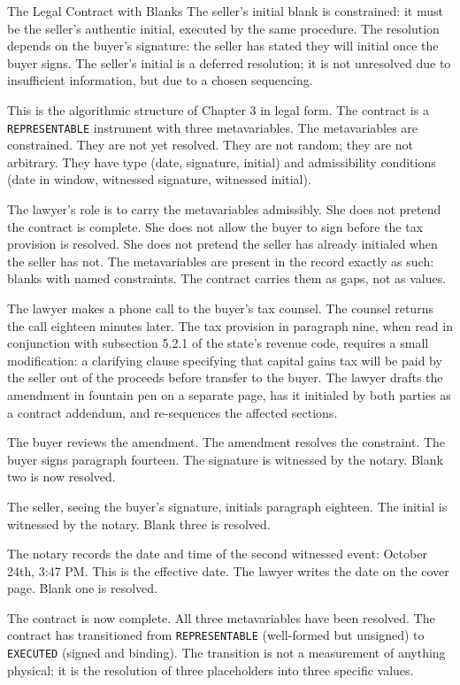 \begin{coda}{The Legal Contract with Blanks}
The seller's initial blank is constrained: it must be the seller's
authentic initial, executed by the same procedure. The resolution
depends on the buyer's signature: the seller has stated they will
initial once the buyer signs. The seller's initial is a deferred
resolution; it is not unresolved due to insufficient information, but
due to a chosen sequencing.

This is the algorithmic structure of Chapter 3 in legal form. The
contract is a \texttt{REPRESENTABLE} instrument with three
metavariables. The metavariables are constrained. They are not yet
resolved. They are not random; they are not arbitrary. They have type
(date, signature, initial) and admissibility conditions (date in
window, witnessed signature, witnessed initial).

The lawyer's role is to carry the metavariables admissibly. She does
not pretend the contract is complete. She does not allow the buyer to
sign before the tax provision is resolved. She does not pretend the
seller has already initialed when the seller has not. The metavariables
are present in the record exactly as such: blanks with named
constraints. The contract carries them as gaps, not as values.

The lawyer makes a phone call to the buyer's tax counsel. The
counsel returns the call eighteen minutes later. The tax provision in
paragraph nine, when read in conjunction with subsection 5.2.1 of the
state's revenue code, requires a small modification: a clarifying
clause specifying that capital gains tax will be paid by the seller
out of the proceeds before transfer to the buyer. The lawyer drafts
the amendment in fountain pen on a separate page, has it initialed by
both parties as a contract addendum, and re-sequences the affected
sections.

The buyer reviews the amendment. The amendment resolves the
constraint. The buyer signs paragraph fourteen. The signature is
witnessed by the notary. Blank two is now resolved.

The seller, seeing the buyer's signature, initials paragraph eighteen.
The initial is witnessed by the notary. Blank three is resolved.

The notary records the date and time of the second witnessed event:
October 24th, 3:47 PM. This is the effective date. The lawyer writes
the date on the cover page. Blank one is resolved.

The contract is now complete. All three metavariables have been
resolved. The contract has transitioned from \texttt{REPRESENTABLE}
(well-formed but unsigned) to \texttt{EXECUTED} (signed and
binding). The transition is not a measurement of anything physical;
it is the resolution of three placeholders into three specific
values.


\end{coda}
